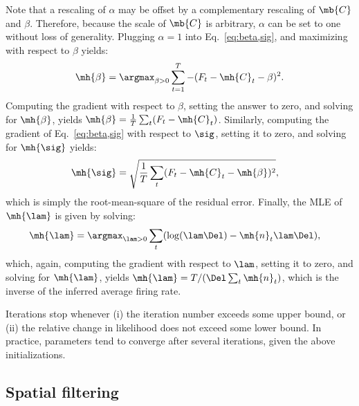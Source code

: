 Note that a rescaling of $\alpha$ may be offset by a complementary rescaling of $\mb{C}$ and $\beta$.  Therefore, because the scale of $\mb{C}$ is arbitrary, $\alpha$ can be set to one without loss of generality.  
Plugging $\alpha=1$ into Eq.~\eqref{eq:beta,sig}, and maximizing with respect to $\beta$ yields:
\begin{align}
\mh{\beta} = \argmax_{\beta>0} \sum_{t=1}^T -(F_t - \mh{C}_t - \beta)^2.
\end{align}
\noindent Computing the gradient with respect to $\beta$, setting the answer to zero, and solving for $\mh{\beta}$, yields $\mh{\beta} = \frac{1}{T} \sum_t (F_t-\mh{C}_t)$.  Similarly, computing the gradient of Eq.~\eqref{eq:beta,sig} with respect to $\sig$, setting it to zero, and solving for $\mh{\sig}$ yields:
\begin{align}
\mh{\sig} &= \sqrt{\frac{1}{T} \sum_t (F_t - \mh{C}_t - \mh{\beta})^2},
\end{align}
which is simply the root-mean-square of the residual error.  Finally, the MLE of $\mh{\lam}$ is given by solving:
\begin{align}
\mh{\lam} &= \argmax_{\lam>0} \sum_t (\log (\lam \Del) - \mh{n}_t \lam \Del),
\end{align}
which, again, computing the gradient with respect to $\lam$, setting it to zero, and solving for $\mh{\lam}$, yields $\mh{\lam}=T/ (\Del \sum_t \mh{n}_t)$, which is the inverse of the inferred average firing rate.


Iterations stop whenever (i) the iteration number exceeds some upper bound, or (ii) the relative change in likelihood does not exceed some lower bound.  In practice, parameters tend to converge after several iterations, given the above initializations. 


\subsection{Spatial filtering} \label{sec:methods:spatial}

